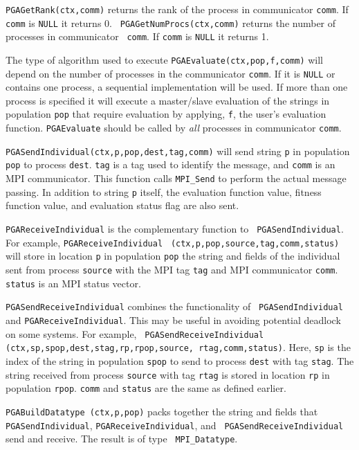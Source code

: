 \documentclass{report}
\begin{document}
{\tt PGAGetRank(ctx,comm)} returns the rank of the process in communicator
{\tt comm}.  If {\tt comm} is {\tt NULL} it returns 0. {\tt
PGAGetNumProcs(ctx,comm)} returns the number of processes in communicator {\tt
comm}.  If {\tt comm} is {\tt NULL} it returns 1.

The type of algorithm used to execute {\tt PGAEvaluate(ctx,pop,f,comm)} will
depend on the number of processes in the communicator {\tt comm}.  If it is
{\tt NULL} or contains one process, a sequential implementation will be used.
If more than one process is specified it will execute a master/slave
evaluation of the strings in population {\tt pop} that require evaluation by
applying, {\tt f}, the user's evaluation function.  {\tt PGAEvaluate} should
be called by {\em all} processes in communicator {\tt comm}.

{\tt PGASendIndividual(ctx,p,pop,dest,tag,comm)} will send string {\tt p} in
population {\tt pop} to process {\tt dest}.  {\tt tag} is a tag used to
identify the message, and {\tt comm} is an MPI communicator. This function
calls {\tt MPI\_Send} to perform the actual message passing.  In addition to
string {\tt p} itself, the evaluation function value, fitness function value,
and evaluation status flag are also sent.
 
\begin{sloppypar}
{\tt PGAReceiveIndividual} is the complementary function to {\tt
PGASendIndividual}.  For example, {\tt PGAReceiveIndividual} {\tt
(ctx,p,pop,source,tag,comm,status)} will store in location {\tt p} in
population {\tt pop} the string and fields of the individual sent from process
{\tt source} with the MPI tag {\tt tag} and MPI communicator {\tt comm}.  {\tt
status} is an MPI status vector.

{\tt PGASendReceiveIndividual} combines the functionality of {\tt
PGASendIndividual} and {\tt PGAReceiveIndividual}.  This may be useful in
avoiding potential deadlock on some systems.  For example, {\tt
PGASendReceiveIndividual} {\tt (ctx,sp,spop,dest,stag,rp,rpop,source,
rtag,comm,status)}.  Here, {\tt sp} is the index of the string in population
{\tt spop} to send to process {\tt dest} with tag {\tt stag}.  The string
received from process {\tt source} with tag {\tt rtag} is stored in location
{\tt rp} in population {\tt rpop}.  {\tt comm} and {\tt status} are the same
as defined earlier.

{\tt PGABuildDatatype (ctx,p,pop)} packs together the string and fields that
{\tt PGASendIndividual}, {\tt PGAReceiveIndividual}, and {\tt
PGASendReceiveIndividual} send and receive.  The result is of type {\tt
MPI\_Datatype}.
\end{sloppypar}
 
\end{document}
